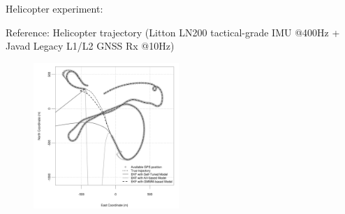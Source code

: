 \documentclass[envcountsect,usenames,dvipsnames]{beamer}
\theoremstyle{mystyle}
\begin{document}
\begin{frame}{Helicopter experiment:}
	\begin{exampleblock}{Reference: }
		Helicopter trajectory (Litton LN200 tactical-grade IMU @400Hz + Javad Legacy L1/L2 GNSS Rx @10Hz)
	\end{exampleblock}


	\begin{figure}
	    \centering
	  \includegraphics[width = 5.5cm]{Images/conthey_trajectory}
	\end{figure}

\end{frame}
\end{document}
